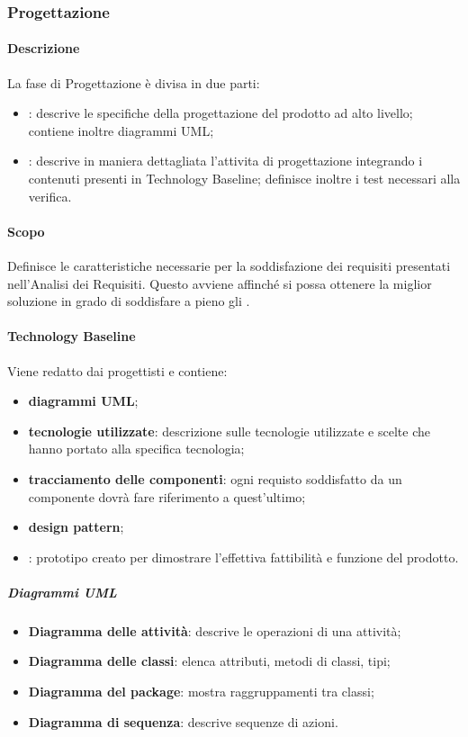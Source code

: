 	\subsubsection{Progettazione} 
    \paragraph{Descrizione} \hfill \break
    La fase di Progettazione è divisa in due parti:
		\begin{itemize}
			\item \textbf{}: descrive le specifiche della progettazione del prodotto ad alto livello; contiene inoltre diagrammi UML;
			\item \textbf{}: descrive in maniera dettagliata l'attivita di progettazione integrando i contenuti presenti in Technology Baseline; definisce inoltre i test necessari alla verifica.
		\end{itemize} 	
    
    \paragraph{Scopo} \hfill \break
    Definisce le caratteristiche necessarie per la soddisfazione dei requisiti presentati nell'Analisi dei Requisiti.
	  Questo avviene affinché si possa ottenere la miglior soluzione in grado di soddisfare a pieno gli .\\
		 
    \paragraph{Technology Baseline} \hfill \break
    Viene redatto dai progettisti e contiene:
    \begin{itemize}
      \item \textbf{diagrammi UML};
      \item \textbf{tecnologie utilizzate}: descrizione sulle tecnologie utilizzate e scelte che hanno portato alla specifica tecnologia;
      \item \textbf{tracciamento delle componenti}: ogni requisto soddisfatto da un componente dovrà fare riferimento a quest'ultimo;
      \item \textbf{design pattern};
      \item \textbf{}: prototipo creato per dimostrare l'effettiva fattibilità e funzione del prodotto.
    \end{itemize}
      \subparagraph{Diagrammi UML} 
      \begin{itemize}
        \item \textbf{Diagramma delle attività}: descrive le operazioni di una attività;
        \item \textbf{Diagramma delle classi}: elenca attributi, metodi di classi, tipi; 
        \item \textbf{Diagramma del package}: mostra raggruppamenti tra classi;
        \item \textbf{Diagramma di sequenza}: descrive sequenze di azioni.
      \end{itemize}
         
